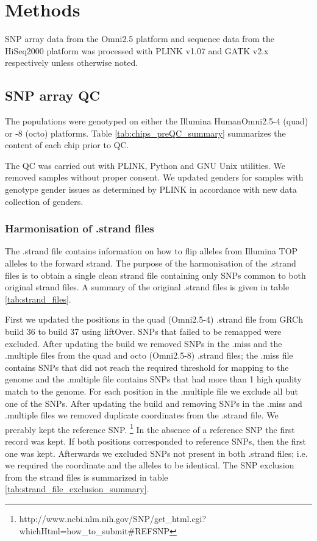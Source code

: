 \section{Methods}

SNP array data from the Omni2.5 platform and sequence data from the HiSeq2000 platform was processed with PLINK v1.07\cite{Purcell2007} and \gls{GATK} v2.x respectively unless otherwise noted.

\subsection{SNP array QC}
\label{subsec:chipQC}
The populations were genotyped on either the Illumina HumanOmni2.5-4 (quad) or -8 (octo) platforms. Table \ref{tab:chips_preQC_summary} summarizes the content of each chip prior to QC.



The \gls{QC} was carried out with PLINK\cite{Purcell2007}, Python and GNU Unix utilities. We removed samples without proper consent. We updated genders for samples with genotype gender issues as determined by PLINK in accordance with new data collection of genders.

\subsubsection{Harmonisation of .strand files}
The .strand file contains information on how to flip alleles from Illumina TOP alleles to the forward strand. The purpose of the harmonisation of the .strand files is to obtain a single clean strand file containing only SNPs common to both original strand files. A summary of the original .strand files is given in table \ref{tab:strand_files}.


First we updated the positions in the quad (Omni2.5-4) .strand file from \gls{GRCh}\cite{10.1371/journal.pbio.1001091} build 36 to build 37 using liftOver.\cite{Karolchik01012014} SNPs that failed to be remapped were excluded. After updating the build we removed \glspl{SNP} in the .miss and the .multiple files from the quad and octo (Omni2.5-8) .strand files; the .miss file contains \glspl{SNP} that did not reach the required threshold for mapping to the genome and the .multiple file contains \glspl{SNP} that had more than 1 high quality match to the genome. For each position in the .multiple file we exclude all but one of the \glspl{SNP}.
After updating the build and removing \glspl{SNP} in the .miss and .multiple files we removed duplicate coordinates from the .strand file. We prerably kept the reference \gls{SNP}. \footnote{http://www.ncbi.nlm.nih.gov/SNP/get\_html.cgi?whichHtml=how\_to\_submit\#REFSNP} In the absence of a reference SNP the first record was kept. If both positions corresponded to reference SNPs, then the first one was kept.
Afterwards we excluded \glspl{SNP} not present in both .strand files; i.e. we required the coordinate and the alleles to be identical. The SNP exclusion from the strand files is summarized in table \ref{tab:strand_file_exclusion_summary}.


